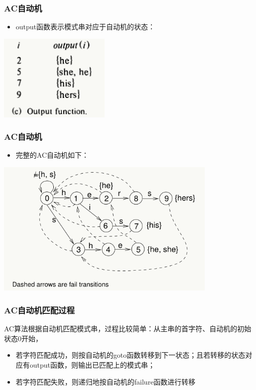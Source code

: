 \begin{frame}[fragile]
  \frametitle{AC自动机}
  \begin{itemize}
  \item output函数表示模式串对应于自动机的状态：
  \end{itemize}

  \begin{center}
  \includegraphics[width=0.4\textwidth]{figs/string/ac_output.png}
  \end{center}
\end{frame}

\begin{frame}[fragile]
  \frametitle{AC自动机}
  \begin{itemize}
  \item 完整的AC自动机如下：
  \end{itemize}

  \begin{center}
  \includegraphics[width=0.8\textwidth]{figs/string/ac.png}
  \end{center}
\end{frame}

\begin{frame}[fragile]
  \frametitle{AC自动机匹配过程}
  AC算法根据自动机匹配模式串，过程比较简单：从主串的首字符、自动机的初始状态0开始，

  \begin{itemize}
  \item 若字符匹配成功，则按自动机的goto函数转移到下一状态；且若转移的状态对应有output函数，则输出已匹配上的模式串；
  \item 若字符匹配失败，则递归地按自动机的failure函数进行转移
  \end{itemize}
\end{frame}

